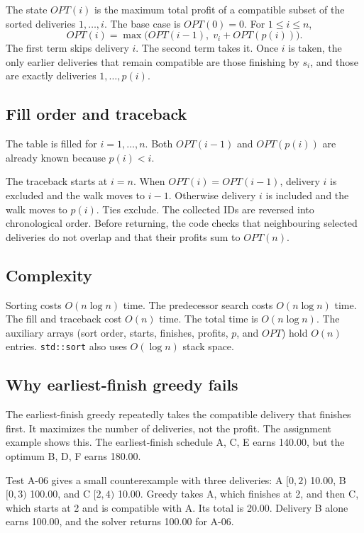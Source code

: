 \documentclass[11pt]{article}
\begin{document}
The state $OPT(i)$ is the maximum total profit of a compatible subset of the sorted deliveries
$1, \ldots, i$. The base case is $OPT(0) = 0$. For $1 \le i \le n$,
\[
OPT(i) = \max\bigl( OPT(i-1),\; v_i + OPT(p(i)) \bigr).
\]
The first term skips delivery $i$. The second term takes it. Once $i$ is taken, the only earlier
deliveries that remain compatible are those finishing by $s_i$, and those are exactly deliveries
$1, \ldots, p(i)$.

\subsection{Fill order and traceback}

The table is filled for $i = 1, \ldots, n$. Both $OPT(i-1)$ and $OPT(p(i))$ are already known
because $p(i) < i$.

The traceback starts at $i = n$. When $OPT(i) = OPT(i-1)$, delivery $i$ is excluded and the walk
moves to $i-1$. Otherwise delivery $i$ is included and the walk moves to $p(i)$. Ties exclude.
The collected IDs are reversed into chronological order. Before returning, the code checks that
neighbouring selected deliveries do not overlap and that their profits sum to $OPT(n)$.

\subsection{Complexity}

Sorting costs $O(n \log n)$ time. The predecessor search costs $O(n \log n)$ time. The fill and
traceback cost $O(n)$ time. The total time is $O(n \log n)$. The auxiliary arrays (sort order,
starts, finishes, profits, $p$, and $OPT$) hold $O(n)$ entries. \texttt{std::sort} also uses
$O(\log n)$ stack space.

\subsection{Why earliest-finish greedy fails}

The earliest-finish greedy repeatedly takes the compatible delivery that finishes first. It
maximizes the number of deliveries, not the profit. The assignment example shows this. The
earliest-finish schedule A, C, E earns 140.00, but the optimum B, D, F earns 180.00.

Test A-06 gives a small counterexample with three deliveries: A $[0,2)$ 10.00, B $[0,3)$ 100.00,
and C $[2,4)$ 10.00. Greedy takes A, which finishes at 2, and then C, which starts at 2 and is
compatible with A. Its total is 20.00. Delivery B alone earns 100.00, and the solver returns
100.00 for A-06.
\end{document}
